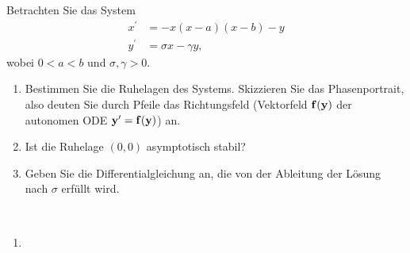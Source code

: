 \begin{exercise}
Betrachten Sie das System
\begin{align*}
  x^{\prime} &= -x(x - a)(x - b) - y \\
  y^{\prime} &= \sigma x - \gamma y,
\end{align*}
wobei $0 < a < b$ und $\sigma, \gamma > 0$.
\begin{enumerate}[label = \textbf{\alph*)}]
\item Bestimmen Sie die Ruhelagen des Systems. Skizzieren Sie das Phasenportrait,
also deuten Sie durch Pfeile das Richtungsfeld (Vektorfeld $\bf{f(y)}$ der
autonomen ODE $\bf{y^{\prime} = f(y)}$) an.
\item Ist die Ruhelage $(0,0)$ asymptotisch stabil?
\item Geben Sie die Differentialgleichung an, die von der Ableitung der Lösung
nach $\sigma$ erfüllt wird.
\end{enumerate}
\end{exercise}
\begin{solution}
\leavevmode \\
\begin{enumerate}[label = \textbf{\alph*)}]
\item
\end{enumerate}
\end{solution}
